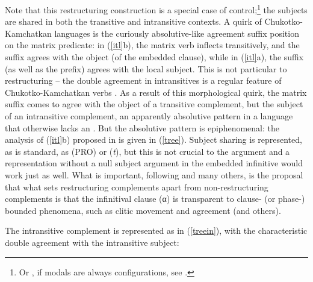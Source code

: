 \documentclass[output=paper]{langsci/langscibook}
\begin{document}
Note that this restructuring construction is a special case of
control;\footnote{Or , if modals are always  configurations, see
\cite{wurmbrand99}.} the subjects are shared in both the transitive and
intransitive contexts. A quirk of Chu\-kotko-Kamchatkan languages is the
curiously absolutive-like agreement suffix position on the matrix predicate: in
(\ref{itl}b), the matrix verb inflects transitively, and the suffix agrees with
the object (of the embedded clause), while in (\ref{itl}a), the suffix (as well
as the prefix) agrees with the local subject. This is not particular to
restructuring -- the double agreement in intransitives is a regular feature of
Chukotko-Kamchatkan verbs \citep{bobaljik98}. As a result of this morphological
quirk, the matrix suffix comes to agree with the object of a transitive
complement, but the subject of an intransitive complement, an apparently
absolutive pattern in a language that otherwise lacks an .
But the absolutive pattern is epiphenomenal: the analysis of (\ref{itl}b)
proposed in \cite{BobWur2005} is given in (\ref{tree}). Subject sharing is
represented, as is standard, as  (PRO) or  (\emph{t}), but this
is not crucial to the argument and a representation without a null
subject
argument in the embedded infinitive would work just as well. What is important,
following \cite{Wurmbrand2001,wurmbrand15} and many others, is the proposal that
what sets restructuring complements apart from non-restructuring complements is
that the infinitival clause (α) is transparent to clause- (or phase-)
bounded phenomena, such as clitic movement and agreement (and others).

\ea \label{tree}
\z

The intransitive complement is represented as in (\ref{treein}), with the
characteristic double agreement with the intransitive subject:
\end{document}
